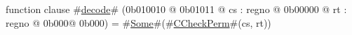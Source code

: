 function clause #\hyperref[zdecode]{decode}# (0b010010 @ 0b01011 @ cs : regno @ 0b00000 @ rt : regno @ 0b000@ 0b000) = #\hyperref[zSome]{Some}#(#\hyperref[zCCheckPerm]{CCheckPerm}#(cs, rt))
